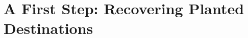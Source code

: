 \documentclass[sigconf]{acmart}
\begin{document}







% 


\section{A First Step: Recovering Planted Destinations}
\label{sec:first-step}
\end{document}
